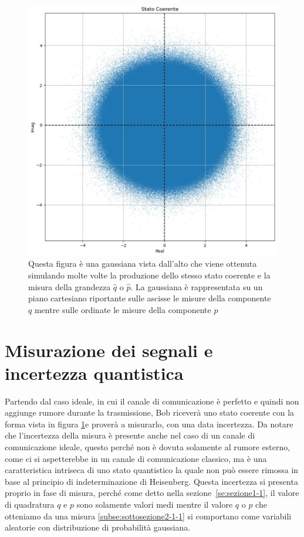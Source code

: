 \begin{figure}[h] 
\begin{center}
\includegraphics[scale=0.4]{figure/stato_coerente.eps}
\end{center}
\caption{Questa figura \`e una gaussiana vista dall'alto che viene ottenuta simulando molte volte la produzione dello stesso stato coerente e la misura della grandezza $\hat q$ o $\hat p$. La gaussiana \`e rappresentata su un piano cartesiano riportante sulle ascisse le misure della componente $q$ mentre sulle ordinate le misure della componente $p$} \label{fig:stato-coerente}
\end{figure}

\section{Misurazione dei segnali e incertezza quantistica}
Partendo dal caso ideale, in cui il canale di comunicazione \`e perfetto e quindi non aggiunge rumore durante la trasmissione, Bob ricever\`a uno stato coerente con la forma vista in figura \ref{fig:stato-coerente}e proverà a misurarlo, con una data incertezza. Da notare che l'incertezza della misura \`e presente anche nel caso di un canale di comunicazione ideale, questo perch\'e non \`e dovuta solamente al rumore esterno, come ci si aspetterebbe in un canale di comunicazione classico, ma \`e una caratteristica intriseca di uno stato quantistico la quale non pu\`o essere rimossa in base al principio di indeterminazione di Heisenberg. Questa incertezza si presenta proprio in fase di misura, perch\'e come detto nella sezione~\ref{se:sezione1-1}, il valore di quadratura $q$ e $p$ sono solamente valori medi mentre il valore $q$ o $p$ che otteniamo da una misura \ref{subse:sottosezione2-1-1} si comportano come variabili aleatorie con distribuzione di probabilit\`a gaussiana. 

